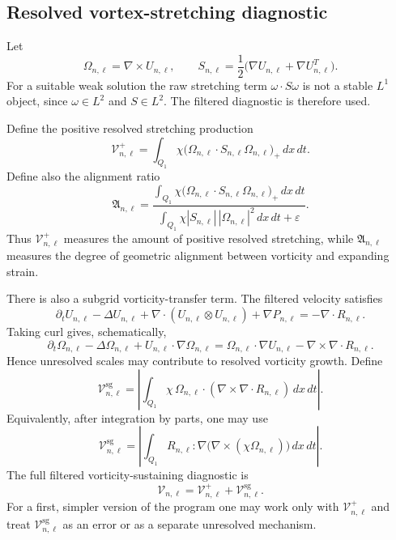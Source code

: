 \documentclass[11pt]{article}
\numberwithin{equation}{section}
\theoremstyle{plain}
\theoremstyle{definition}
\theoremstyle{remark}
\newcommand{\Vort}{\mathcal V}
\newcommand{\sg}{\mathrm{sg}}
\begin{document}
\subsection{Resolved vortex-stretching diagnostic}

Let
\[
    \Omega_{n,\ell}=\nabla\times U_{n,\ell},
    \qquad
    S_{n,\ell}=\frac12\bigl(\nabla U_{n,\ell}+\nabla U_{n,\ell}^T\bigr).
\]
For a suitable weak solution the raw stretching term \(\omega\cdot S\omega\) is not a stable \(L^1\) object, since \(\omega\in L^2\) and \(S\in L^2\).  The filtered diagnostic is therefore used.

Define the positive resolved stretching production
\begin{equation}
    \Vort^+_{n,\ell}
    =
    \int_{Q_1}
    \chi
    \bigl(\Omega_{n,\ell}\cdot S_{n,\ell}\Omega_{n,\ell}\bigr)_+
    \,dx\,dt.
\end{equation}
Define also the alignment ratio
\begin{equation}
    \mathfrak A_{n,\ell}
    =
    \frac{
    \int_{Q_1}
    \chi
    \bigl(\Omega_{n,\ell}\cdot S_{n,\ell}\Omega_{n,\ell}\bigr)_+
    \,dx\,dt
    }
    {
    \int_{Q_1}\chi |S_{n,\ell}|\,|\Omega_{n,\ell}|^2\,dx\,dt+\varepsilon
    }.
\end{equation}
Thus \(\Vort^+_{n,\ell}\) measures the amount of positive resolved stretching, while \(\mathfrak A_{n,\ell}\) measures the degree of geometric alignment between vorticity and expanding strain.

There is also a subgrid vorticity-transfer term.  The filtered velocity satisfies
\[
    \partial_t U_{n,\ell}-\Delta U_{n,\ell}
    +\nabla\cdot(U_{n,\ell}\otimes U_{n,\ell})
    +\nabla P_{n,\ell}
    =
    -\nabla\cdot R_{n,\ell}.
\]
Taking curl gives, schematically,
\[
    \partial_t\Omega_{n,\ell}-\Delta\Omega_{n,\ell}
    +U_{n,\ell}\cdot\nabla\Omega_{n,\ell}
    =
    \Omega_{n,\ell}\cdot\nabla U_{n,\ell}
    -\nabla\times\nabla\cdot R_{n,\ell}.
\]
Hence unresolved scales may contribute to resolved vorticity growth.  Define
\begin{equation}
    \Vort^{\sg}_{n,\ell}
    =
    \left|
    \int_{Q_1}
    \chi\,
    \Omega_{n,\ell}\cdot
    (\nabla\times\nabla\cdot R_{n,\ell})
    \,dx\,dt
    \right|.
\end{equation}
Equivalently, after integration by parts, one may use
\begin{equation}
    \Vort^{\sg}_{n,\ell}
    =
    \left|
    \int_{Q_1}
    R_{n,\ell}:
    \nabla\bigl(\nabla\times(\chi\Omega_{n,\ell})\bigr)
    \,dx\,dt
    \right|.
\end{equation}
The full filtered vorticity-sustaining diagnostic is
\begin{equation}
    \Vort_{n,\ell}
    =
    \Vort^+_{n,\ell}
    +
    \Vort^{\sg}_{n,\ell}.
\end{equation}
For a first, simpler version of the program one may work only with \(\Vort^+_{n,\ell}\) and treat \(\Vort^{\sg}_{n,\ell}\) as an error or as a separate unresolved mechanism.
\end{document}
